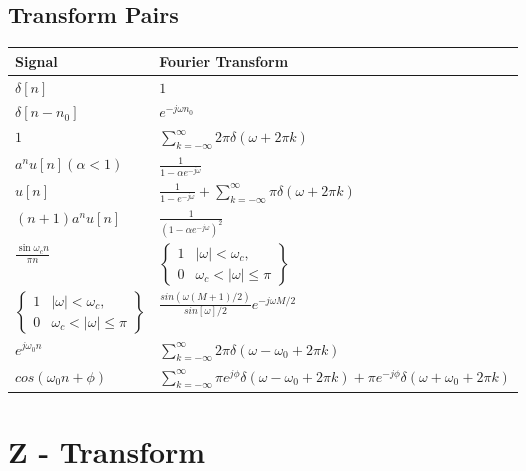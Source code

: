 \documentclass{article}
\begin{document}
\subsection*{Transform Pairs}
\begin{center}
    \begin{tabularx}{\textwidth}{XX}
        \hline
        Signal & Fourier Transform\\
        \hline
        $\delta[n]$ & $1$\\
        $\delta[n-n_0]$ & $e^{-j\omega n_0}$\\
        $1$ & $\sum_{k=-\infty}^{\infty}{2\pi \delta(\omega+2\pi k)}$\\
        $a^nu[n] (\alpha < 1)$ & $\frac{1}{1-\alpha e^{-j\omega}}$\\
        $u[n]$ & $\frac{1}{1 - e^{-j\omega}}+\sum_{k=-\infty}^{\infty}{\pi \delta(\omega+2\pi k)}$\\
        $(n+1)a^nu[n]$ & $\frac{1}{(1-\alpha e^{-j\omega})^2}$\\
        $\frac{\sin \omega_c n}{\pi n}$ & $\left\{
            \begin{array}{cc}
                1 & |\omega|<\omega_c,\\
                0 & \omega_c < |\omega| \le \pi 
            \end{array}
            \right\}$\\
        $\left\{
            \begin{array}{cc}
                1 & |\omega|<\omega_c,\\
                0 & \omega_c < |\omega| \le \pi 
            \end{array}
            \right\}$ & $\frac{sin(\omega(M+1)/2)}{sin[\omega]/2}e^{-j\omega M/2}$\\
        $e^{j\omega_0 n}$ & $\sum_{k=-\infty}^{\infty}{2\pi \delta(\omega - \omega_0+2\pi k)}$\\
        $cos(\omega_0 n+\phi)$ & $\sum_{k=-\infty}^{\infty}{\pi e^{j\phi}\delta(\omega - \omega_0+2\pi k)+\pi e^{-j\phi}\delta(\omega + \omega_0+2\pi k)}$
    \end{tabularx}
\end{center}
\pagebreak
\section*{Z - Transform}
\end{document}

